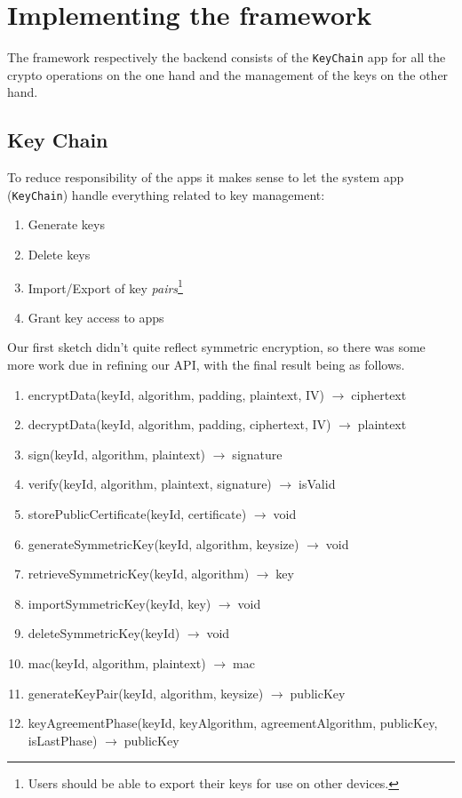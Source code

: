 \documentclass[a4paper,draft]{scrartcl}
\newcommand{\totype}{\(\to\;\)}
\begin{document}
\section{Implementing the framework}

	The framework respectively the backend consists of the \texttt{KeyChain} app for all the crypto operations on the one hand and the management of the keys on the other hand.

	\subsection{Key Chain}
		To reduce responsibility of the apps it makes sense to let the system app (\texttt{KeyChain}) handle everything related to key management:
		\begin{enumerate}
			\item Generate keys
			\item Delete keys
			\item Import/Export of key \emph{pairs}\footnote{Users should be able to export their keys for use on other devices.}
			\item Grant key access to apps
		\end{enumerate}
		Our first sketch didn't quite reflect symmetric encryption, so there was some more work due in refining our API, with the final result being as follows.

		\begin{enumerate}
		\tt
			\item encryptData(keyId, algorithm, padding, plaintext, IV) \totype ciphertext
			\item decryptData(keyId, algorithm, padding, ciphertext, IV) \totype plaintext
			\item sign(keyId, algorithm, plaintext) \totype signature
			\item verify(keyId, algorithm, plaintext, signature) \totype isValid
			\item storePublicCertificate(keyId, certificate) \totype void

			\item generateSymmetricKey(keyId, algorithm, keysize) \totype void
			\item retrieveSymmetricKey(keyId, algorithm) \totype key
			\item importSymmetricKey(keyId, key) \totype void
			\item deleteSymmetricKey(keyId) \totype void
			\item mac(keyId, algorithm, plaintext) \totype mac

			\item generateKeyPair(keyId, algorithm, keysize) \totype publicKey
			\item keyAgreementPhase(keyId, keyAlgorithm, agreementAlgorithm,
				\linebreak %
				publicKey, isLastPhase) \totype publicKey
		\end{enumerate}
\end{document}
